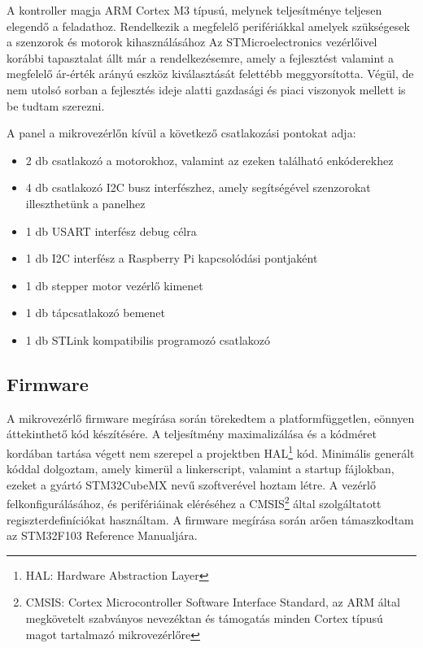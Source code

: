 A kontroller magja ARM Cortex M3 típusú, melynek teljesítménye teljesen elegendő
a feladathoz. Rendelkezik a megfelelő perifériákkal amelyek szükségesek a
szenzorok és motorok kihasználásához Az STMicroelectronics vezérlőivel korábbi
tapasztalat állt már a rendelkezésemre, amely a fejlesztést valamint a megfelelő
ár-érték arányú eszköz kiválasztását felettébb meggyorsította. Végül, de nem
utolsó sorban a fejlesztés ideje alatti gazdasági és piaci viszonyok mellett is
be tudtam szerezni.

A panel a mikrovezérlőn kívül a következő csatlakozási pontokat adja:

\begin{itemize}
\item 2 db csatlakozó a motorokhoz, valamint az ezeken található enkóderekhez
\item 4 db csatlakozó I2C busz interfészhez, amely segítségével szenzorokat illeszthetünk a panelhez
\item 1 db USART interfész debug célra
\item 1 db I2C interfész a Raspberry Pi kapcsolódási pontjaként
\item 1 db stepper motor vezérlő kimenet
\item 1 db tápcsatlakozó bemenet
\item 1 db STLink kompatibilis programozó csatlakozó
\end{itemize}


\subsection{Firmware}

A mikrovezérlő firmware megírása során törekedtem a platformfüggetlen, eönnyen
áttekinthető kód készítésére. A teljesítmény maximalizálása és a kódméret
kordában tartása végett nem szerepel a projektben HAL\footnote{HAL: Hardware
Abstraction Layer} kód. Minimális generált kóddal dolgoztam, amely kimerül a
linkerscript, valamint a startup fájlokban, ezeket a gyártó STM32CubeMX nevű
szoftverével hoztam létre. A vezérlő felkonfigurálásához, és perifériáinak
eléréséhez a CMSIS\footnote{CMSIS: Cortex Microcontroller Software Interface
Standard, az ARM által megkövetelt szabványos nevezéktan és támogatás minden
Cortex típusú magot tartalmazó mikrovezérlőre} által szolgáltatott
regiszterdefiníciókat használtam. A firmware megírása során arően támaszkodtam
az STM32F103 Reference Manualjára.

